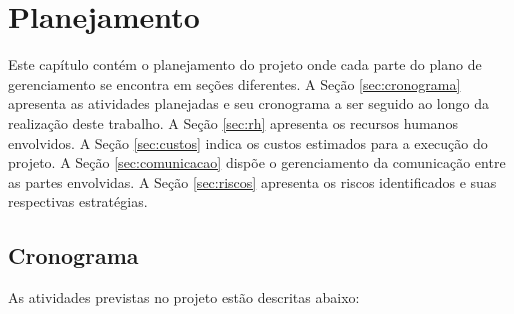 
\def\coordenador{Renato Cislaghi}
\def\orientador{Vinicius Marino Calvo Torres de Freitas}
\def\coorientador{Márcio Bastos Castro}
\def\autor{Thales Alexandre Zirbel Hubner}


\chapter{Planejamento}

Este capítulo contém o planejamento do projeto onde cada parte do plano de gerenciamento se encontra em seções diferentes. A Seção \ref{sec:cronograma} apresenta as atividades planejadas e seu cronograma a ser seguido ao longo da realização deste trabalho. A Seção \ref{sec:rh} apresenta os recursos humanos envolvidos. A Seção \ref{sec:custos} indica os custos estimados para a execução do projeto. A Seção \ref{sec:comunicacao} dispõe o gerenciamento da comunicação entre as partes envolvidas. A Seção \ref{sec:riscos} apresenta os riscos identificados e suas respectivas estratégias.

\section{Cronograma}

As atividades previstas no projeto estão descritas abaixo:

